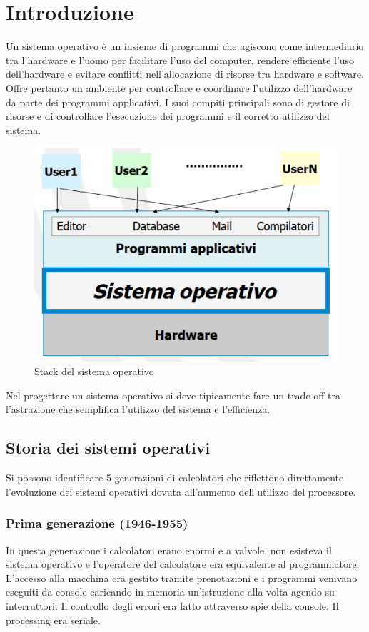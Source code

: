 \chapter{Introduzione}
Un sistema operativo \`e un insieme di programmi che agiscono come intermediario tra l'hardware e l'uomo per facilitare l'uso del computer, rendere efficiente l'uso dell'hardware e evitare conflitti 
nell'allocazione di risorse tra hardware e software. Offre pertanto un ambiente per controllare e coordinare l'utilizzo dell'hardware da parte dei programmi applicativi. I suoi compiti principali sono di gestore di
risorse e di controllare l'esecuzione dei programmi e il corretto utilizzo del sistema.
\begin{figure}[h]
\includegraphics[width=\textwidth]{Pictures/StackSistemaOperativo.png}
\caption{Stack del sistema operativo}
\end{figure}
Nel progettare un sistema operativo si deve tipicamente fare un trade-off tra l'astrazione che semplifica l'utilizzo del sistema e l'efficienza.
\section{Storia dei sistemi operativi}
Si possono identificare 5 generazioni di calcolatori che riflettono direttamente l'evoluzione dei sistemi operativi dovuta all'aumento dell'utilizzo del processore. 
\subsection{Prima generazione (1946-1955)}
In questa generazione i calcolatori erano enormi e a valvole, non esisteva il sistema operativo e l'operatore del calcolatore era equivalente al programmatore. L'accesso alla macchina era gestito tramite 
prenotazioni e i programmi venivano eseguiti da console caricando in memoria un'istruzione alla volta agendo su interruttori. Il controllo degli errori era fatto attraverso spie della console. Il processing era 
seriale.
